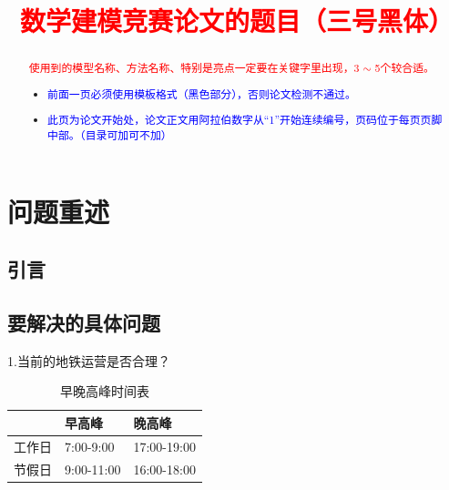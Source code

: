 \documentclass[12pt,a4paper]{mcmthesis}
\title{\textcolor{red}{数学建模竞赛论文的题目（三号黑体）}}
\date{}
\begin{document}
    \begin{abstract}
        

        \begin{keywords}
        {\song\xiaosihao
        \textcolor{red}{使用到的模型名称、方法名称、特别是亮点一定要在关键字里出现，3 $\sim$ 5个较合适。}}
        \end{keywords}

        \begin{itemize}
            \item \textcolor{blue}{前面一页必须使用模板格式（黑色部分），否则论文检测不通过。}
            \item \textcolor{blue}{此页为论文开始处，论文正文用阿拉伯数字从“1”开始连续编号，页码位于每页页脚中部。（目录可加可不加）}
        \end{itemize}

    \end{abstract}
    \maketitle
    \renewcommand{\contentsname}{\centerline{\sanhao\bfseries\HEI 目\quad 录}}
    \tableofcontents

    \newpage
    \setcounter{page}{1}


    \section{问题重述}

    \subsection{引言}
    

    \subsection{要解决的具体问题}

    1.当前的地铁运营是否合理？

    \begin{table}[h]
        \centering
        \caption{早晚高峰时间表}
        \label{tab:早晚高峰}
        \begin{tabular}{|l|l|l|}
            \hline
            & 早高峰        & 晚高峰         \\ \hline
            工作日 & 7:00-9:00  & 17:00-19:00 \\ \hline
            节假日 & 9:00-11:00 & 16:00-18:00 \\ \hline
        \end{tabular}
    \end{table}
\end{document}
